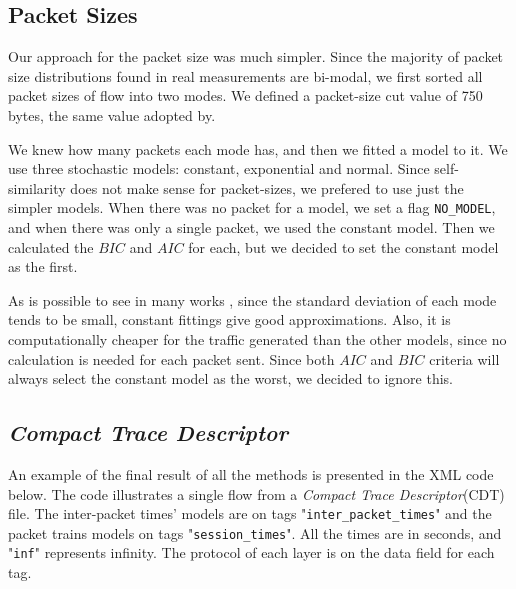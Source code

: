 \subsection{Packet Sizes}


Our approach for the packet size was much simpler. Since the majority of packet size distributions found in real measurements are bi-modal\cite{packet-distribution-model}\cite{sourcesonoff-paper}\cite{udp-flows-model}, we first sorted all packet sizes of flow into two modes. We defined a packet-size cut value of 750 bytes, the same value adopted by\cite{udp-flows-model}.

We knew how many packets each mode has, and then we fitted a model to it. We use three stochastic models: constant, exponential and normal. Since self-similarity does not make sense for packet-sizes, we prefered to use just the simpler models. When there was no packet for a model, we set a flag \texttt{NO\_MODEL}, and when there was only a single packet, we used the constant model. Then we calculated the $BIC$ and $AIC$ for each, but we decided to set the constant model as the first.

As is possible to see in many works\cite{packet-distribution-model} \cite{udp-flows-model}, since the standard deviation of each mode tends to be small, constant fittings give good approximations. Also, it is computationally cheaper for the traffic generated than the other models, since no calculation is needed for each packet sent. Since both $AIC$ and $BIC$ criteria will always select the constant model as the worst, we decided to ignore this.

\subsection{ \textit{Compact Trace Descriptor} }


An example of the final result of all the methods is presented in the XML code below. The code illustrates a single flow from a \textit{Compact Trace Descriptor}(CDT) file. The inter-packet times' models are on tags "\texttt{inter\_packet\_times}" and the packet trains models on tags "\texttt{session\_times}". All the times are in seconds, and "\texttt{inf}" represents infinity. The protocol of each layer is on the data field for each tag. 


